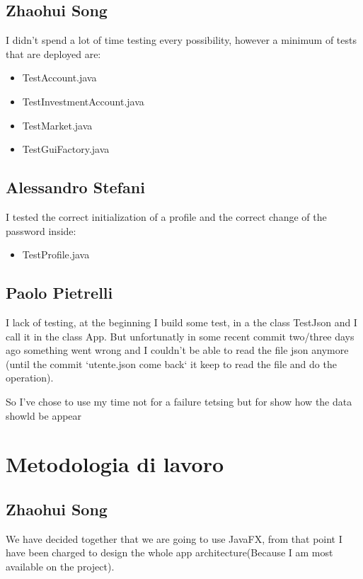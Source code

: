 \documentclass[a4paper,12pt]{report}
\begin{document}
\subsection{Zhaohui Song}
I didn't spend a lot of time testing every possibility, however a minimum of tests that are deployed are:
\begin{itemize}
    \item TestAccount.java
    \item TestInvestmentAccount.java
    \item TestMarket.java
    \item TestGuiFactory.java
\end{itemize}

\subsection{Alessandro Stefani}
I tested the correct initialization of a profile and the correct change of the password inside:
\begin{itemize}
    \item TestProfile.java
\end{itemize}

\subsection{Paolo Pietrelli}
I lack of testing, at the beginning I build some test, in a the class TestJson and I call it in the class App.
But unfortunatly in some recent commit two/three days ago something went wrong and I couldn't be able to read the file json anymore (until the commit `utente.json come back` it keep to read the file and do the operation).

So I've chose to use my time not for a failure tetsing but for show how the data showld be appear 

\section{Metodologia di lavoro}
\subsection{Zhaohui Song}
We have decided together that we are going to use JavaFX, from that point I have been charged to design the whole app architecture(Because I am most available on the project).
\end{document}
